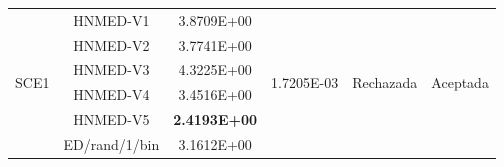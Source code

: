 \begin{table}
{\begin{tabular}{lccccc}
			\multirow{6}{*}{SCE1} & HNMED-V1      & 3.8709E+00                   & \multirow{6}{*}{ 1.7205E-03 }  & \multirow{6}{*}{Rechazada}& \multirow{6}{*}{Aceptada} \\
			& HNMED-V2      & 3.7741E+00                   &                    &                          &                            \\
			& HNMED-V3      & 4.3225E+00                   &                    &                          &                            \\
			& HNMED-V4      & 3.4516E+00                   &                    &                          &                            \\
			& HNMED-V5      & \textbf{2.4193E+00 }         &                    &                          &                            \\
			& ED/rand/1/bin &3.1612E+00 &                  &                    &                            \\
			
		\end{tabular}
	}
\end{table}


